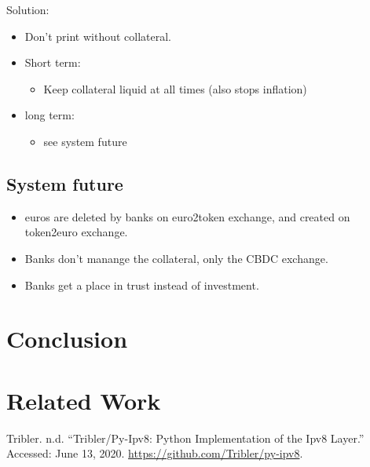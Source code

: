 \documentclass[whitelogo]{tudelft-report}
\providecommand{\tightlist}{%
  \setlength{\itemsep}{0pt}\setlength{\parskip}{0pt}}
\begin{document}
Solution:

\begin{itemize}
\tightlist
\item
  Don't print without collateral.
\item
  Short term:

  \begin{itemize}
  \tightlist
  \item
    Keep collateral liquid at all times (also stops inflation)
  \end{itemize}
\item
  long term:

  \begin{itemize}
  \tightlist
  \item
    see system future
  \end{itemize}
\end{itemize}

\section{System future}\label{system-future}

\begin{itemize}
\tightlist
\item
  euros are deleted by banks on euro2token exchange, and created on
  token2euro exchange.
\item
  Banks don't manange the collateral, only the CBDC exchange.
\item
  Banks get a place in trust instead of investment.
\end{itemize}

\chapter{Conclusion}\label{conclusion}

\chapter*{Related Work}\label{related-work}

\hypertarget{refs}{}
\hypertarget{ref-ipv8}{}
Tribler. n.d. ``Tribler/Py-Ipv8: Python Implementation of the Ipv8
Layer.'' Accessed: June 13, 2020.
\url{https://github.com/Tribler/py-ipv8}.

\appendix

%

\nocite{*}


\end{document}

